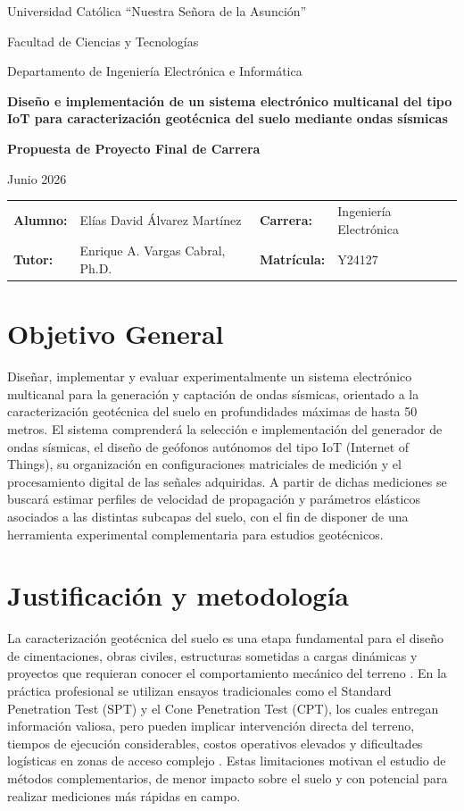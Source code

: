 \documentclass[11pt,a4paper]{article}
\newcommand{\universidad}{Universidad Cat\'olica ``Nuestra Se\~nora de la Asunci\'on''}
\newcommand{\facultad}{Facultad de Ciencias y Tecnolog\'ias}
\newcommand{\departamento}{Departamento de Ingenier\'ia Electr\'onica e Inform\'atica}
\newcommand{\titulo}{Dise\~no e implementaci\'on de un sistema electr\'onico multicanal del tipo IoT para caracterizaci\'on geot\'ecnica del suelo mediante ondas s\'ismicas}
\newcommand{\alumno}{El\'ias David \'Alvarez Mart\'inez}
\newcommand{\carrera}{Ingenier\'ia Electr\'onica}
\newcommand{\tutor}{Enrique A. Vargas Cabral, Ph.D.}
\newcommand{\matricula}{Y24127}
\begin{document}
\begin{center}
    {\large \universidad}\par
    {\facultad}\par
    {\departamento}\par
    \vspace{0.28cm}
    {\Large\bfseries \titulo}\par
    \vspace{0.14cm}
    {\bfseries Propuesta de Proyecto Final de Carrera}\par
    Junio 2026
\end{center}
\vspace{0.07cm}
\begin{tabularx}{\textwidth}{@{}lX lX@{}}
\textbf{Alumno:} & \alumno & \textbf{Carrera:} & \carrera \\
\textbf{Tutor:} & \tutor & \textbf{Matr\'icula:} & \matricula \\
\end{tabularx}

\section{Objetivo General}
Dise\~nar, implementar y evaluar experimentalmente un sistema electr\'onico multicanal para la generaci\'on y captaci\'on de ondas s\'ismicas, orientado a la caracterizaci\'on geot\'ecnica del suelo en profundidades m\'aximas de hasta 50 metros. El sistema comprender\'a la selecci\'on e implementaci\'on del generador de ondas s\'ismicas, el dise\~no de ge\'ofonos aut\'onomos del tipo IoT (Internet of Things), su organizaci\'on en configuraciones matriciales de medici\'on y el procesamiento digital de las se\~nales adquiridas. A partir de dichas mediciones se buscar\'a estimar perfiles de velocidad de propagaci\'on y par\'ametros el\'asticos asociados a las distintas subcapas del suelo, con el fin de disponer de una herramienta experimental complementaria para estudios geot\'ecnicos.

\section{Justificaci\'on y metodolog\'ia}
La caracterizaci\'on geot\'ecnica del suelo es una etapa fundamental para el dise\~no de cimentaciones, obras civiles, estructuras sometidas a cargas din\'amicas y proyectos que requieran conocer el comportamiento mec\'anico del terreno \cite{Kramer1996,Mitchell2005}. En la pr\'actica profesional se utilizan ensayos tradicionales como el Standard Penetration Test (SPT) y el Cone Penetration Test (CPT), los cuales entregan informaci\'on valiosa, pero pueden implicar intervenci\'on directa del terreno, tiempos de ejecuci\'on considerables, costos operativos elevados y dificultades log\'isticas en zonas de acceso complejo \cite{ASTM}. Estas limitaciones motivan el estudio de m\'etodos complementarios, de menor impacto sobre el suelo y con potencial para realizar mediciones m\'as r\'apidas en campo.
\end{document}
